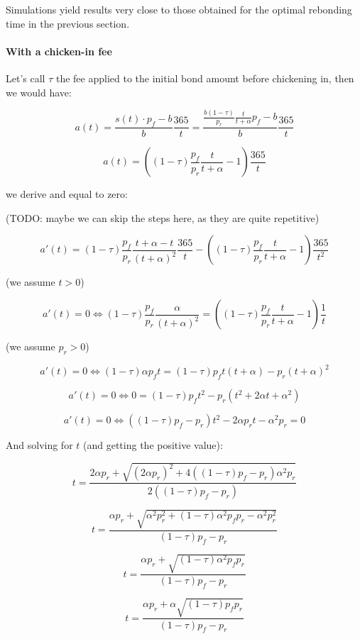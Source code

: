\documentclass{article}
\begin{document}
Simulations yield results very close to those obtained for the optimal rebonding time in the previous section.

\paragraph{With a chicken-in fee}
 Let’s call $\tau$ the fee applied to the initial bond amount before chickening in, then we would have:

\[
a(t) = \frac{s(t) \cdot p_f - b}{b} \frac{365}{t} = \frac{\frac{b(1-\tau)}{p_r} \frac{t}{t+\alpha} p_f - b}{b} \frac{365}{t}
\]

\begin{equation}
  \label{eq:apr}
a(t) = \left((1-\tau)\frac{p_f}{p_r} \frac{t}{t+\alpha} - 1\right) \frac{365}{t}
\end{equation}

we derive and equal to zero:

(TODO: maybe we can skip the steps here, as they are quite repetitive)

\[
a'(t) = (1-\tau)\frac{p_f}{p_r} \frac{t + \alpha - t}{(t+\alpha)^2} \frac{365}{t} - \left((1-\tau)\frac{p_f}{p_r} \frac{t}{t+\alpha} - 1\right) \frac{365}{t^2}
\]

(we assume $t > 0$)

\[
a'(t) = 0 \iff (1-\tau)\frac{p_f}{p_r} \frac{\alpha}{(t+\alpha)^2} = \left((1-\tau)\frac{p_f}{p_r} \frac{t}{t+\alpha} - 1\right) \frac{1}{t}
\]

(we assume $p_r > 0$)

\[
a'(t) = 0 \iff (1-\tau) \alpha p_f t = (1-\tau) p_f t(t+\alpha)  - p_r(t+\alpha)^2
\]

\[
a'(t) = 0 \iff 0 = (1-\tau)p_f t^2 - p_r(t^2+2\alpha t+\alpha^2)
\]

\[
a'(t) = 0 \iff ((1-\tau)p_f-p_r)t^2  - 2\alpha p_r t - \alpha^2 p_r = 0
\]

And solving for $t$ (and getting the positive value):

\[
t = \frac{2\alpha p_r + \sqrt{(2\alpha p_r)^2 + 4((1-\tau)p_f-p_r) \alpha^2 p_r}}{2((1-\tau)p_f-p_r)}
\]

\[
t = \frac{\alpha p_r + \sqrt{\alpha^2 p_r^2 + (1-\tau) \alpha^2 p_f p_r- \alpha^2 p_r^2}}{(1-\tau)p_f-p_r}
\]

\[
t = \frac{\alpha p_r + \sqrt{(1-\tau) \alpha^2 p_f p_r}}{(1-\tau)p_f-p_r}
\]

\[
t = \frac{\alpha p_r + \alpha \sqrt{(1-\tau)p_f p_r}}{(1-\tau)p_f-p_r}
\]
\end{document}
